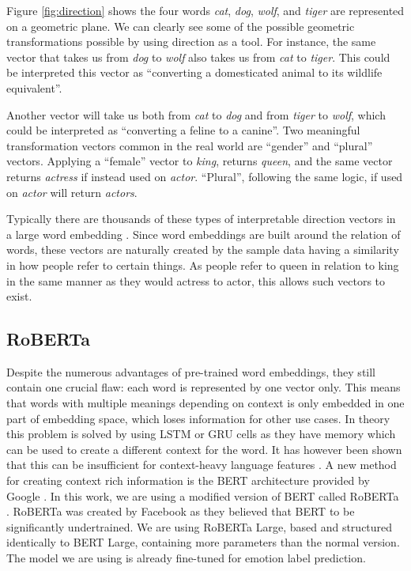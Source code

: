 \documentclass[nofilelist]{cslthse-msc}
\begin{document}
Figure \ref{fig:direction} shows the four words \textit{cat}, \textit{dog}, \textit{wolf}, and \textit{tiger} are represented on a geometric plane. We can clearly see some of the possible geometric transformations possible by using direction as a tool. For instance, the same vector that takes us from \textit{dog} to \textit{wolf} also takes us from \textit{cat} to \textit{tiger}. This could be interpreted this vector as ``converting a domesticated animal to its wildlife equivalent''. 

Another vector will take us both from \textit{cat} to \textit{dog} and from \textit{tiger} to \textit{wolf}, which could be interpreted as ``converting a feline to a canine''. Two meaningful transformation vectors common in the real world are ``gender'' and ``plural'' vectors. Applying a ``female'' vector to \textit{king}, returns \textit{queen}, and the same vector returns \textit{actress} if instead used on \textit{actor}. ``Plural'', following the same logic, if used on \textit{actor} will return \textit{actors}. 

Typically there are thousands of these types of interpretable direction vectors in a large word embedding \citep{franoischollet2017learning}. Since word embeddings are built around the relation of words, these vectors are naturally created by the sample data having a similarity in how people refer to certain things. As people refer to queen in relation to king in the same manner as they would actress to actor, this allows such vectors to exist.

\subsection{RoBERTa}
Despite the numerous advantages of pre-trained word embeddings, they still contain one crucial flaw: each word is represented by one vector only. This means that words with multiple meanings depending on context is only embedded in one part of embedding space, which loses information for other use cases. In theory this problem is solved by using LSTM or GRU cells as they have memory which can be used to create a different context for the word. It has however been shown that this can be insufficient for context-heavy language features \citep{Zhang_deep}. A new method for creating context rich information is the BERT architecture provided by Google \citep{BERT}. In this work, we are using a modified version of BERT called RoBERTa \citep{RoBERTa}. RoBERTa was created by Facebook as they believed that BERT to be significantly undertrained. We are using RoBERTa Large, based and structured identically to BERT Large, containing more parameters than the normal version. The model we are using is already fine-tuned for emotion label prediction.
\end{document}
